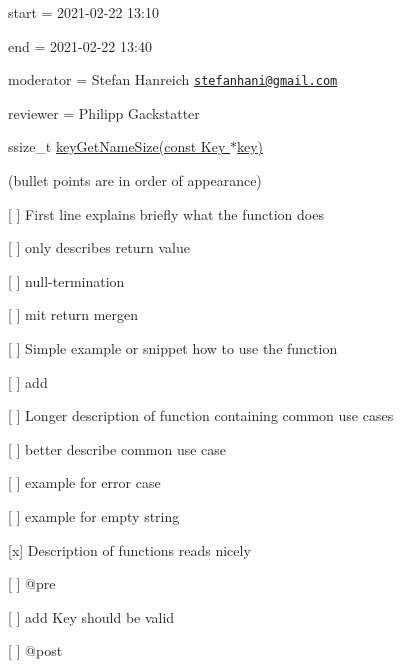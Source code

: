 
\begin{DoxyItemize}
\item start = 2021-\/02-\/22 13\+:10
\item end = 2021-\/02-\/22 13\+:40
\item moderator = Stefan Hanreich \href{mailto:stefanhani@gmail.com}{\tt stefanhani@gmail.\+com}
\item reviewer = Philipp Gackstatter
\end{DoxyItemize}

{\ttfamily ssize\+\_\+t \hyperlink{group__keyname_gabdbcfa51ed8a387e47ead207affa2d2e}{key\+Get\+Name\+Size(const Key $\ast$key)}}

(bullet points are in order of appearance)


\begin{DoxyItemize}
\item \mbox{[} \mbox{]} First line explains briefly what the function does
\begin{DoxyItemize}
\item \mbox{[} \mbox{]} only describes return value
\item \mbox{[} \mbox{]} null-\/termination
\item \mbox{[} \mbox{]} mit return mergen
\end{DoxyItemize}
\item \mbox{[} \mbox{]} Simple example or snippet how to use the function
\begin{DoxyItemize}
\item \mbox{[} \mbox{]} add
\end{DoxyItemize}
\item \mbox{[} \mbox{]} Longer description of function containing common use cases
\begin{DoxyItemize}
\item \mbox{[} \mbox{]} better describe common use case
\item \mbox{[} \mbox{]} example for error case
\item \mbox{[} \mbox{]} example for empty string
\end{DoxyItemize}
\item \mbox{[}x\mbox{]} Description of functions reads nicely
\item \mbox{[} \mbox{]} {\ttfamily @pre}
\begin{DoxyItemize}
\item \mbox{[} \mbox{]} add \textquotesingle{}Key should be valid\textquotesingle{}
\end{DoxyItemize}
\item \mbox{[} \mbox{]} {\ttfamily @post}

\end{DoxyItemize}
